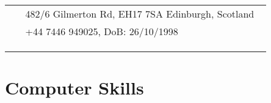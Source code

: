 \documentclass[10pt]{article} %
\begin{document}
\begin{paracol}{2}
\parbox[top][0.12\textheight][c]{\linewidth}{ %
	\vspace{-0.04\textheight} %
	\colorbox{shade}{ %
		\begin{supertabular}{p{0.05\linewidth}|p{0.795\linewidth}} %
            \raisebox{-1pt}{\faHome} & 482/6 Gilmerton Rd, EH17 7SA Edinburgh, Scotland \\ %
			\raisebox{-1pt}{\faPhone} & +44 7446 949025, DoB: 26/10/1998 \\ %
            \raisebox{0pt}{\small\faEnvelope} & \\
            \raisebox{0pt}{\small\faEnvelope} & \\
           
            \raisebox{0pt}{\faGithub} & \\ %
		\end{supertabular}
	}
}


\section{Computer Skills}





\end{paracol}
\end{document}
